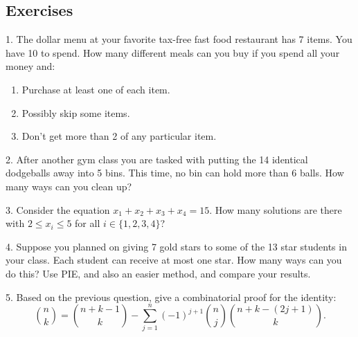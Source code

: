 \documentclass[10pt,]{book}
\theoremstyle{plain}
\theoremstyle{definition}
\theoremstyle{definition}
\theoremstyle{definition}
\numberwithin{equation}{chapter}
\begin{document}
\subsection[Exercises]{Exercises}\label{exercises-9}
\begin{exerciselist}
\item[1.]\hypertarget{exercise-92}{}
            The dollar menu at your favorite tax-free fast food restaurant has 7 items. You have
            \textdollar{}10 to spend. How many different meals can you buy if you spend all your money and:
\leavevmode%
\begin{enumerate}[label=(\alph*)]
\item\hypertarget{li-639}{}
                Purchase at least one of each item.
\item\hypertarget{li-640}{}
                Possibly skip some items.
\item\hypertarget{li-641}{}
                Don't get more than 2 of any particular item.
\end{enumerate}
\par\smallskip
\item[2.]\hypertarget{exercise-93}{}
            After another gym class you are tasked with putting the 14 identical dodgeballs away into 5 bins. This time, no bin can hold more than 6 balls. How many ways can you clean up?
\par\smallskip
\item[3.]\hypertarget{exercise-94}{}
            Consider the equation \(x_1 + x_2 + x_3 + x_4 = 15\). How many solutions are there with \(2 \le x_i \le 5\) for all \(i \in \{1,2,3,4\}\)?
\par\smallskip
\item[4.]\hypertarget{exercise-95}{}
            Suppose you planned on giving 7 gold stars to some of the 13 star students in your class. Each student can receive at most one star. How many ways can you do this? Use PIE, and also an easier method, and compare your results.
\par\smallskip
\item[5.]\hypertarget{exercise-96}{}
            Based on the previous question, give a combinatorial proof for the identity:
            \begin{equation*}
              {n \choose k} = {n+k-1 \choose k} - \sum_{j=1}^n (-1)^{j+1}{n \choose j}{n+k-(2j+1) \choose k}.
            \end{equation*}

\end{exerciselist}
\end{document}
